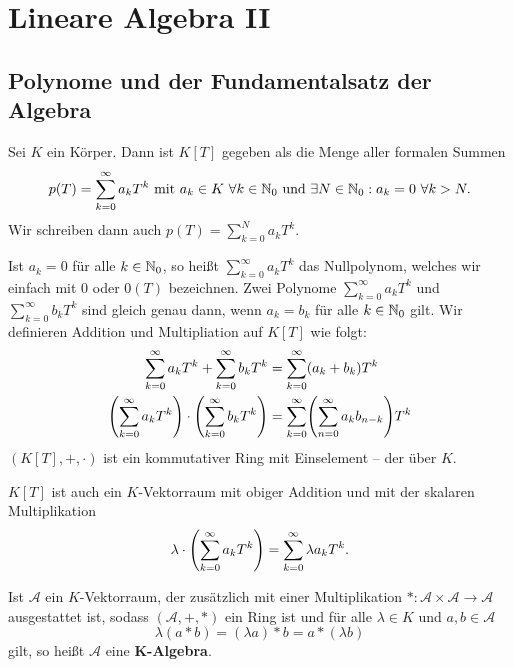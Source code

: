 \chapter{Lineare Algebra II} %
\label{cha:2}
\setcounter{section}{0}
\section{Polynome und der Fundamentalsatz der Algebra}

\begin{erinnerung}[Polynomring]
	\label{erinnerung:II.1.1}
	Sei $K$ ein Körper.
	Dann ist $K[T]$ gegeben als die Menge aller formalen Summen
	\[
		p(T) = \sum_{k=0}^{\infty} a_k T^k \text{ mit } a_k \in K \ \forall k \in \mathbb{N}_0 \text{ und } \exists N \in \mathbb{N}_0 : a_k = 0 \ \forall k > N.
	\]
	Wir schreiben dann auch $p(T) = \sum_{k=0}^{N} a_kT^k$.
	
	Ist $a_k=0$ für alle $k \in \mathbb{N}_0$, so heißt $\sum_{k=0}^{\infty} a_kT^k$ das Nullpolynom, welches wir einfach mit $0$ oder $0(T)$ bezeichnen.
	Zwei Polynome $\sum_{k=0}^{\infty} a_kT^k$ und $\sum_{k=0}^{\infty} b_kT^k$ sind gleich genau dann, wenn $a_k = b_k$ für alle $k \in \mathbb{N}_0$ gilt.
	Wir definieren Addition und Multipliation auf $K[T]$ wie folgt:
	\begin{align*}
		\sum_{k=0}^{\infty} a_kT^{k} + \sum_{k=0}^{\infty} b_kT^{k} &= \sum_{k=0}^{\infty} (a_k+b_k)T^{k} \\
		\enb{\sum_{k=0}^{\infty} a_kT^{k}} \cdot \enb{\sum_{k=0}^{\infty} b_kT^{k}} &= \sum_{k=0}^{\infty} \enb{\sum_{n=0}^{\infty} a_kb_{n-k}} T^{k}
	\end{align*}
	$(K[T],+,\cdot)$ ist ein kommutativer Ring mit Einselement -- der  über $K$.
	
	$K[T]$ ist auch ein $K$-Vektorraum mit obiger Addition und mit der skalaren Multiplikation
	\[
		\lambda \cdot \left(\sum_{k=0}^{\infty} a_kT^{k}\right) = \sum_{k=0}^{\infty} \lambda a_kT^{k}.
	\]
\end{erinnerung}

\begin{bemerkung}
	\label{bem:II.1.2}
	Ist $\mathcal{A}$ ein $K$-Vektorraum, der zusätzlich mit einer Multiplikation $*\colon \mathcal{A} \times \mathcal{A} \rightarrow \mathcal{A}$ ausgestattet ist, sodass $(\mathcal{A},+,*)$ ein Ring ist und für alle $\lambda \in K$ und $a,b\in \mathcal{A}$
	\[
		\lambda(a*b) = (\lambda a)*b = a * (\lambda b)
	\]
	gilt, so heißt $\mathcal{A}$ eine $\mathbf{K}$\textbf{-Algebra}. 
\end{bemerkung}

